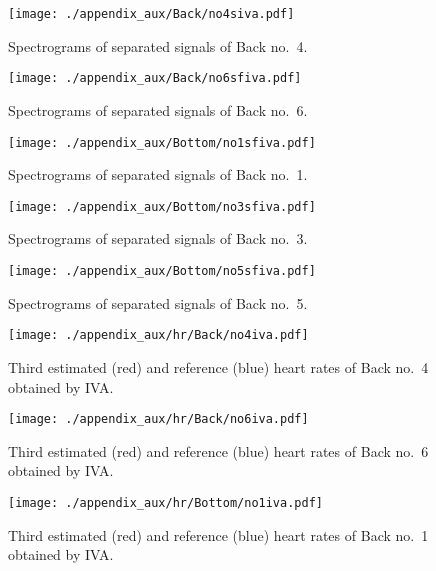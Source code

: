 \begin{figure}[tb]
\centering
\texttt{[image: ./appendix\_aux/Back/no4siva.pdf]}
\caption{Spectrograms of separated signals of Back no.~4.}
\end{figure}

\begin{figure}[tb]
\centering
\texttt{[image: ./appendix\_aux/Back/no6sfiva.pdf]}
\caption{Spectrograms of separated signals of Back no.~6.}
\end{figure}

\begin{figure}[tb]
\centering
\texttt{[image: ./appendix\_aux/Bottom/no1sfiva.pdf]}
\caption{Spectrograms of separated signals of Back no.~1.}
\end{figure}

\begin{figure}[tb]
\centering
\texttt{[image: ./appendix\_aux/Bottom/no3sfiva.pdf]}
\caption{Spectrograms of separated signals of Back no.~3.}
\end{figure}

\begin{figure}[tb]
\centering
\texttt{[image: ./appendix\_aux/Bottom/no5sfiva.pdf]}
\caption{Spectrograms of separated signals of Back no.~5.}
\end{figure}

\begin{figure}[tb]
\centering
\texttt{[image: ./appendix\_aux/hr/Back/no4iva.pdf]}
  \caption{Third estimated (red) and reference (blue) heart rates of Back no.~4 obtained by IVA.}
\end{figure}

\begin{figure}[tb]
\centering
\texttt{[image: ./appendix\_aux/hr/Back/no6iva.pdf]}
  \caption{Third estimated (red) and reference (blue) heart rates of Back no.~6 obtained by IVA.}
\end{figure}

\begin{figure}[tb]
\centering
\texttt{[image: ./appendix\_aux/hr/Bottom/no1iva.pdf]}
  \caption{Third estimated (red) and reference (blue) heart rates of Back no.~1 obtained by IVA.}
\end{figure}

